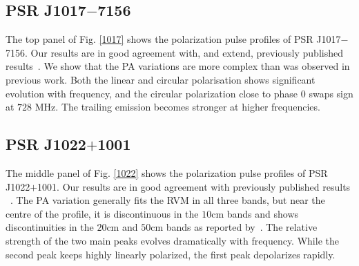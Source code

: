 \documentclass[useAMS,usenatbib]{mn2e}
\begin{document}
\begin{appendices}
%
%

\subsection{PSR J1017$-$7156}

The top panel of Fig. \ref{1017} shows the polarization pulse profiles of 
PSR J1017$-$7156.
%
Our results are in good agreement with, and extend, previously published 
results~\citep{Keith12}. 
%
We show that the PA variations are more complex than was observed in 
previous work.
%
%
Both the linear and circular polarisation shows significant evolution 
with frequency, and the circular polarization close to phase $0$ swaps sign 
at $728$ MHz. 
%
The trailing emission becomes stronger at higher frequencies.



\subsection{PSR J1022$+$1001}

The middle panel of Fig. \ref{1022} shows the polarization pulse profiles 
of PSR J1022$+$1001.
%
Our results are in good agreement with previously published results
~\citep{1022Kramer99,Stairs99,Ord04,Yan11}.
%
The PA variation generally fits the RVM in all three bands, but near the 
centre of the profile, it is discontinuous in the $10$cm bands and shows 
discontinuities in the $20$cm and $50$cm bands as reported by~\citet{Yan11}.
%
The relative strength of the two main peaks evolves dramatically with 
frequency.
%
While the second peak keeps highly linearly polarized, the first peak 
depolarizes rapidly.

%



\end{appendices}
\end{document}

